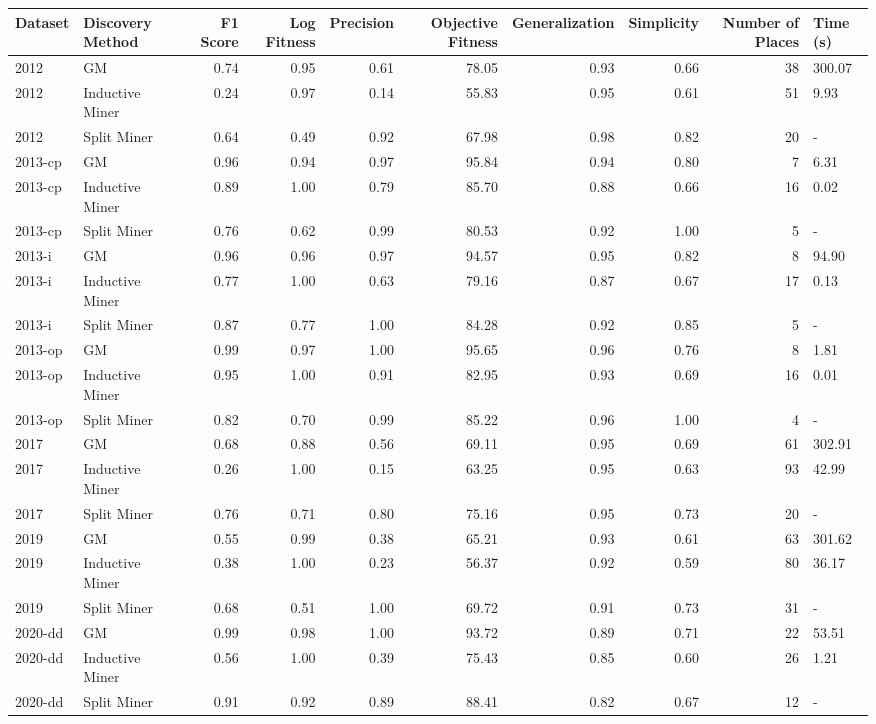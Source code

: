 \begin{tabular}{llrrrrrrrl}
\toprule
Dataset & Discovery Method & F1 Score & Log Fitness & Precision & Objective Fitness & Generalization & Simplicity & Number of Places & Time (s) \\
\midrule
2012 & GM & 0.74 & 0.95 & 0.61 & 78.05 & 0.93 & 0.66 & 38 & 300.07 \\
2012 & Inductive Miner & 0.24 & 0.97 & 0.14 & 55.83 & 0.95 & 0.61 & 51 & 9.93 \\
2012 & Split Miner & 0.64 & 0.49 & 0.92 & 67.98 & 0.98 & 0.82 & 20 & - \\
2013-cp & GM & 0.96 & 0.94 & 0.97 & 95.84 & 0.94 & 0.80 & 7 & 6.31 \\
2013-cp & Inductive Miner & 0.89 & 1.00 & 0.79 & 85.70 & 0.88 & 0.66 & 16 & 0.02 \\
2013-cp & Split Miner & 0.76 & 0.62 & 0.99 & 80.53 & 0.92 & 1.00 & 5 & - \\
2013-i & GM & 0.96 & 0.96 & 0.97 & 94.57 & 0.95 & 0.82 & 8 & 94.90 \\
2013-i & Inductive Miner & 0.77 & 1.00 & 0.63 & 79.16 & 0.87 & 0.67 & 17 & 0.13 \\
2013-i & Split Miner & 0.87 & 0.77 & 1.00 & 84.28 & 0.92 & 0.85 & 5 & - \\
2013-op & GM & 0.99 & 0.97 & 1.00 & 95.65 & 0.96 & 0.76 & 8 & 1.81 \\
2013-op & Inductive Miner & 0.95 & 1.00 & 0.91 & 82.95 & 0.93 & 0.69 & 16 & 0.01 \\
2013-op & Split Miner & 0.82 & 0.70 & 0.99 & 85.22 & 0.96 & 1.00 & 4 & - \\
2017 & GM & 0.68 & 0.88 & 0.56 & 69.11 & 0.95 & 0.69 & 61 & 302.91 \\
2017 & Inductive Miner & 0.26 & 1.00 & 0.15 & 63.25 & 0.95 & 0.63 & 93 & 42.99 \\
2017 & Split Miner & 0.76 & 0.71 & 0.80 & 75.16 & 0.95 & 0.73 & 20 & - \\
2019 & GM & 0.55 & 0.99 & 0.38 & 65.21 & 0.93 & 0.61 & 63 & 301.62 \\
2019 & Inductive Miner & 0.38 & 1.00 & 0.23 & 56.37 & 0.92 & 0.59 & 80 & 36.17 \\
2019 & Split Miner & 0.68 & 0.51 & 1.00 & 69.72 & 0.91 & 0.73 & 31 & - \\
2020-dd & GM & 0.99 & 0.98 & 1.00 & 93.72 & 0.89 & 0.71 & 22 & 53.51 \\
2020-dd & Inductive Miner & 0.56 & 1.00 & 0.39 & 75.43 & 0.85 & 0.60 & 26 & 1.21 \\
2020-dd & Split Miner & 0.91 & 0.92 & 0.89 & 88.41 & 0.82 & 0.67 & 12 & - \\

\end{tabular}
